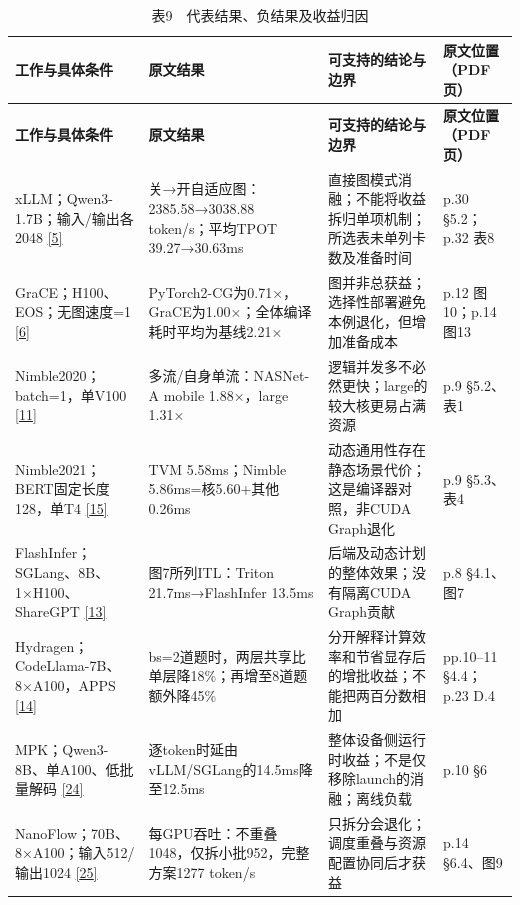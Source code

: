 \documentclass[UTF8,11pt,fontset=windows]{ctexart}
\begin{document}
\begingroup\small
\begin{longtable}[]{@{}>{\raggedright\arraybackslash}p{}>{\raggedright\arraybackslash}p{}>{\raggedright\arraybackslash}p{}>{\raggedright\arraybackslash}p{}@{}}
\caption{表9　代表结果、负结果及收益归因}\tabularnewline
\toprule
\textbf{工作与具体条件} & \textbf{原文结果} & \textbf{可支持的结论与边界} & \textbf{原文位置（PDF页）} \\
\midrule
\endfirsthead
\toprule
\textbf{工作与具体条件} & \textbf{原文结果} & \textbf{可支持的结论与边界} & \textbf{原文位置（PDF页）} \\
\midrule
\endhead
xLLM；Qwen3-1.7B；输入/输出各2048 \protect\hyperlink{ref-5}{{[}5{]}} & 关→开自适应图：2385.58→3038.88 token/s；平均TPOT 39.27→30.63ms & 直接图模式消融；不能将收益拆归单项机制；所选表未单列卡数及准备时间 & p.30 §5.2；p.32 表8 \\
GraCE；H100、EOS；无图速度=1 \protect\hyperlink{ref-6}{{[}6{]}} & PyTorch2-CG为0.71×，GraCE为1.00×；全体编译耗时平均为基线2.21× & 图并非总获益；选择性部署避免本例退化，但增加准备成本 & p.12 图10；p.14 图13 \\
Nimble2020；batch=1，单V100 \protect\hyperlink{ref-11}{{[}11{]}} & 多流/自身单流：NASNet-A mobile 1.88×，large 1.31× & 逻辑并发多不必然更快；large的较大核更易占满资源 & p.9 §5.2、表1 \\
Nimble2021；BERT固定长度128，单T4 \protect\hyperlink{ref-15}{{[}15{]}} & TVM 5.58ms；Nimble 5.86ms=核5.60+其他0.26ms & 动态通用性存在静态场景代价；这是编译器对照，非CUDA Graph退化 & p.9 §5.3、表4 \\
FlashInfer；SGLang、8B、1×H100、ShareGPT \protect\hyperlink{ref-13}{{[}13{]}} & 图7所列ITL：Triton 21.7ms→FlashInfer 13.5ms & 后端及动态计划的整体效果；没有隔离CUDA Graph贡献 & p.8 §4.1、图7 \\
Hydragen；CodeLlama-7B、8×A100，APPS \protect\hyperlink{ref-14}{{[}14{]}} & bs=2道题时，两层共享比单层降18\%；再增至8道题额外降45\% & 分开解释计算效率和节省显存后的增批收益；不能把两百分数相加 & pp.10--11 §4.4；p.23 D.4 \\
MPK；Qwen3-8B、单A100、低批量解码 \protect\hyperlink{ref-24}{{[}24{]}} & 逐token时延由vLLM/SGLang的14.5ms降至12.5ms & 整体设备侧运行时收益；不是仅移除launch的消融；离线负载 & p.10 §6 \\
NanoFlow；70B、8×A100；输入512/输出1024 \protect\hyperlink{ref-25}{{[}25{]}} & 每GPU吞吐：不重叠1048，仅拆小批952，完整方案1277 token/s & 只拆分会退化；调度重叠与资源配置协同后才获益 & p.14 §6.4、图9 \\

\end{longtable}
\end{document}
